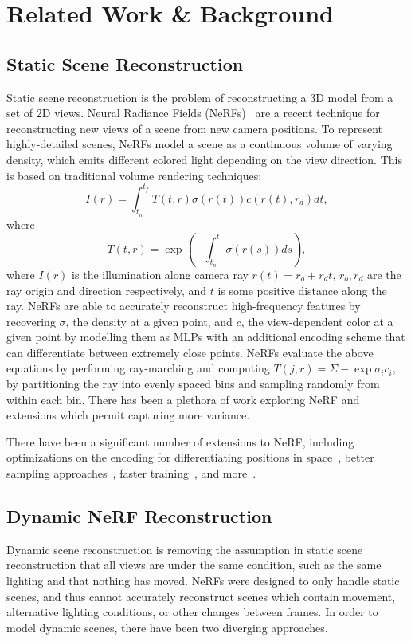 \section*{Related Work \& Background}

\subsection*{Static Scene Reconstruction}

Static scene reconstruction is the problem of reconstructing a 3D model from a set of 2D views.
Neural Radiance Fields (NeRFs)~\cite{mildenhall2020nerf} are a recent technique for reconstructing new views of a scene from new camera positions. To represent highly-detailed scenes, NeRFs model a scene as a continuous volume of varying density, which emits different colored light depending on the view direction. This is based on traditional volume rendering techniques:
\[ I(r) = \int_{t_n}^{t_f} T(t, r) \sigma(r(t)) c(r(t), r_d)dt, \]
where 
\[ T(t, r) = \exp(-\int_{t_n}^{t} \sigma(r(s))ds), \]
\noindent
where $I(r)$ is the illumination along camera ray $r(t) = r_o + r_d t$, $r_o, r_d$ are the ray origin and direction respectively, and $t$ is some positive distance along the ray. NeRFs are able to accurately reconstruct high-frequency features by recovering $\sigma$, the density at a given point, and $c$, the view-dependent color at a given point by modelling them as MLPs with an additional encoding scheme that can differentiate between extremely close points. NeRFs evaluate the above equations by performing ray-marching and computing $T(j,r) = \Sigma -\exp\sigma_i c_i$, by partitioning the ray into evenly spaced bins and sampling randomly from within each bin. There has been a plethora of work exploring NeRF and extensions which permit capturing more variance.

There have been a significant number of extensions to NeRF, including optimizations on the encoding for differentiating positions in space~\cite{tancik2020fourfeat}, better sampling approaches~\cite{barron2021mipnerf}, faster training~\cite{yu2021plenoxels}, and more~\cite{sitzmann2019siren}.

\subsection*{Dynamic NeRF Reconstruction}

Dynamic scene reconstruction is removing the assumption in static scene reconstruction that all views are under the same condition, such as the same lighting and that nothing has moved.
NeRFs were designed to only handle static scenes, and thus cannot accurately reconstruct scenes which contain movement, alternative lighting conditions, or other changes between frames.
In order to model dynamic scenes, there have been two diverging approaches.

